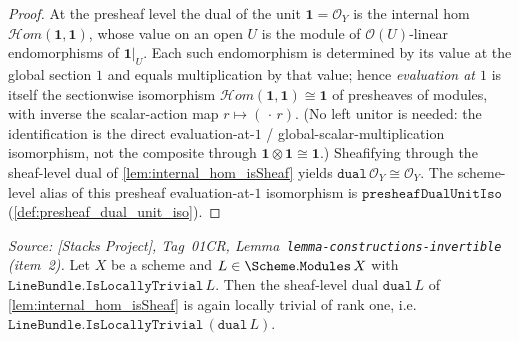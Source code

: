 \begin{proof}
  \leanok
  At the presheaf level the dual of the unit \(\mathbf{1} = \mathcal{O}_Y\) is the internal
  hom \(\mathcal{H}om(\mathbf{1}, \mathbf{1})\), whose value on an open \(U\) is the module
  of \(\mathcal{O}(U)\)-linear endomorphisms of \(\mathbf{1}|_U\). Each such endomorphism is
  determined by its value at the global section \(1\) and equals multiplication by that
  value; hence \emph{evaluation at \(1\)} is itself the sectionwise isomorphism
  \(\mathcal{H}om(\mathbf{1}, \mathbf{1}) \cong \mathbf{1}\) of presheaves of modules, with
  inverse the scalar-action map \(r \mapsto (\,\cdot\,r)\). (No left unitor is needed: the
  identification is the direct evaluation-at-\(1\) / global-scalar-multiplication
  isomorphism, not the composite through \(\mathbf{1} \otimes \mathbf{1} \cong \mathbf{1}\).)
  Sheafifying through the sheaf-level dual of \cref{lem:internal_hom_isSheaf} yields
  \(\mathtt{dual}\,\mathcal{O}_Y \cong \mathcal{O}_Y\). The scheme-level alias of this
  presheaf evaluation-at-\(1\) isomorphism is
  \(\mathtt{presheafDualUnitIso}\) (\cref{def:presheaf_dual_unit_iso}).
\end{proof}

\begin{lemma}\leanok
  \label{lem:dual_isLocallyTrivial}
  \textit{Source: [Stacks Project], Tag~01CR,
  Lemma~\texttt{lemma-constructions-invertible} (item~2).}
  Let \(X\) be a scheme and \(L \in \Scheme.\mathtt{Modules}\,X\) with
  \(\mathtt{LineBundle.IsLocallyTrivial}\,L\). Then the sheaf-level dual
  \(\mathtt{dual}\,L\) of \cref{lem:internal_hom_isSheaf} is again locally trivial of
  rank one, i.e.\ \(\mathtt{LineBundle.IsLocallyTrivial}\,(\mathtt{dual}\,L)\).
\end{lemma}

